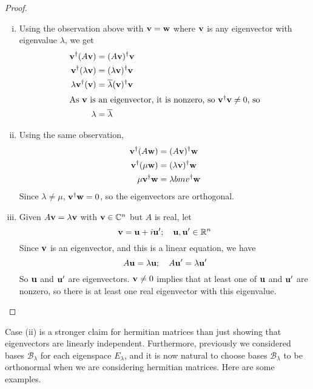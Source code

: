 \begin{proof}
	\begin{enumerate}[(i)]
		\item Using the observation above with $\vb v = \vb w$ where $\vb v$ is any eigenvector with eigenvalue $\lambda$, we get
		      \begin{align*}
			      \vb v^\dagger (A\vb v)        & = (A\vb v)^\dagger \vb v                   \\
			      \vb v^\dagger (\lambda\vb v)  & = (\lambda\vb v)^\dagger \vb v             \\
			      \lambda \vb v^\dagger (\vb v) & = \overline{\lambda} (\vb v)^\dagger \vb v \\
			      \intertext{As $\vb v$ is an eigenvector, it is nonzero, so $\vb v^\dagger \vb v \neq 0$, so}
			      \lambda                       & = \overline \lambda
		      \end{align*}
		\item Using the same observation,
		      \begin{align*}
			      \vb v^\dagger (A \vb w)   & = (A \vb v)^\dagger \vb w       \\
			      \vb v^\dagger (\mu \vb w) & = (\lambda \vb v)^\dagger \vb w \\
			      \mu \vb v^\dagger \vb w   & = \lambda bm v^\dagger \vb w
		      \end{align*}
		      Since $\lambda \neq \mu$, $\vb v^\dagger \vb w = 0$, so the eigenvectors are orthogonal.
		\item Given $A\vb v = \lambda \vb v$ with $\vb v \in \mathbb C^n$ but $A$ is real, let
		      \[ \vb v = \vb u + i\vb u';\quad \vb u, \vb u' \in \mathbb R^n \]
		      Since $\vb v$ is an eigenvector, and this is a linear equation, we have
		      \[ A\vb u = \lambda \vb u;\quad A\vb u' = \lambda \vb u' \]
		      So $\vb u$ and $\vb u'$ are eigenvectors. $\vb v \neq 0$ implies that at least one of $\vb u$ and $\vb u'$ are nonzero, so there is at least one real eigenvector with this eigenvalue.
	\end{enumerate}
\end{proof}
Case (ii) is a stronger claim for hermitian matrices than just showing that eigenvectors are linearly independent. Furthermore, previously we considered bases $\mathcal B_\lambda$ for each eigenspace $E_\lambda$, and it is now natural to choose bases $\mathcal B_\lambda$ to be orthonormal when we are considering hermitian matrices. Here are some examples.
